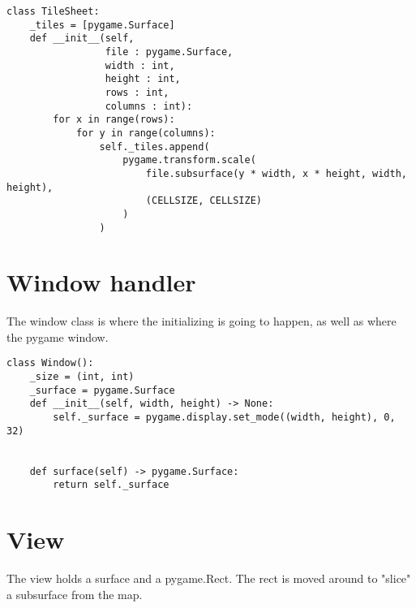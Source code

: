 \documentclass[11pt]{article}
\begin{document}
\begin{verbatim}
class TileSheet:
    _tiles = [pygame.Surface]
    def __init__(self,
                 file : pygame.Surface,
                 width : int,
                 height : int,
                 rows : int,
                 columns : int):
        for x in range(rows):
            for y in range(columns):
                self._tiles.append(
                    pygame.transform.scale(
                        file.subsurface(y * width, x * height, width, height),
                        (CELLSIZE, CELLSIZE)
                    )
                )
\end{verbatim}


\section{Window handler}
\label{sec:org6f2d68c}

The window class is where the initializing is going to happen, as well as where the pygame window.


\begin{verbatim}
class Window():
    _size = (int, int)
    _surface = pygame.Surface
    def __init__(self, width, height) -> None:
        self._surface = pygame.display.set_mode((width, height), 0, 32)

        
    def surface(self) -> pygame.Surface:
        return self._surface
\end{verbatim}

\section{View}
\label{sec:orgdfc5f32}

The view holds a surface and a pygame.Rect. The rect is moved around to "slice" a subsurface from the map. 
\end{document}
